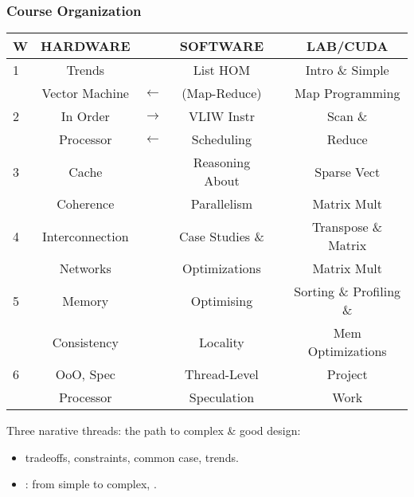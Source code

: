\begin{frame}
\frametitle{Course Organization}

\begin{tabular}{lccccc}
W  & HARDWARE  & & SOFTWARE     & & LAB/CUDA \\\hline\hline
1 & Trends        &                         & List HOM     & & Intro \& Simple\\
  & Vector Machine & $\longleftarrow$ & (Map-Reduce) & & Map Programming\\\hline
%
2 & In Order & $\longrightarrow$ & VLIW Instr   & & Scan \&\\
  & Processor& $\longleftarrow$ & Scheduling   & & Reduce \\\hline
%
3 & Cache     & & Reasoning About     & & Sparse Vect\\
  & Coherence & & Parallelism   & & Matrix Mult\\\hline
%
4 & Interconnection & & Case Studies \&   & & Transpose \& Matrix\\
  & Networks        & & Optimizations   & & Matrix Mult\\\hline
%
5 & Memory      & & Optimising   & & Sorting \& Profiling \& \\
  & Consistency & & Locality     & & Mem Optimizations \\\hline
%
6 & \alert{OoO, Spec}   & & Thread-Level   & & Project \\
  & \alert{Processor}   & & Speculation    & & Work    \\\hline

\end{tabular}
\medskip

Three narative threads: the path to complex \& good design: 
\begin{itemize}
    \item {} tradeoffs, constraints, common case, trends.
    \item {}: from simple to complex, .
\end  {itemize}
\end{frame}

